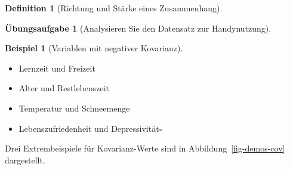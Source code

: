 \documentclass[
  a4paper,
  DIV=11]{scrreprt}
\providecommand{\tightlist}{%
  \setlength{\itemsep}{0pt}\setlength{\parskip}{0pt}}\usepackage{longtable,booktabs,array}
\theoremstyle{definition}
\newtheorem{exercise}{Übungsaufgabe}[chapter]
\theoremstyle{definition}
\newtheorem{example}{Beispiel}[chapter]
\theoremstyle{definition}
\newtheorem{definition}{Definition}[chapter]
\theoremstyle{remark}
\begin{document}
\begin{definition}[Richtung und Stärke eines
Zusammenhang]
\begin{exercise}[Analysieren Sie den Datensatz zur
Handynutzung]
\begin{example}[Variablen mit negativer
Kovarianz]
~

\begin{itemize}
\tightlist
\item
  Lernzeit und Freizeit
\item
  Alter und Restlebenszeit
\item
  Temperatur und Schneemenge
\item
  Lebenszufriedenheit und Depressivität\(\square\)
\end{itemize}

\end{example}

Drei Extrembeispiele für Kovarianz-Werte sind in
Abbildung~\ref{fig-demos-cov} dargestellt.

\begin{figure}

\begin{minipage}{0.33\linewidth}



\end{minipage}%
%
\begin{minipage}{0.33\linewidth}

\end{minipage}
\end{figure}
\end{exercise}
\end{definition}
\end{document}
